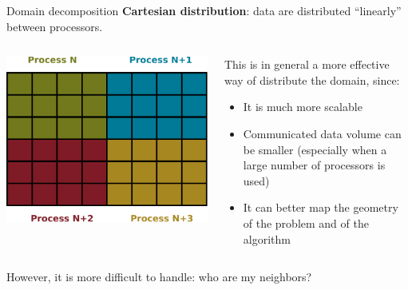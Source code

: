 \documentclass[aspectratio=43]{beamer}
\begin{document}
\begin{frame}[fragile]{Domain decomposition}
\textbf{Cartesian distribution}: data are distributed “linearly” between processors.
\vspace{0.5cm}
\begin{columns}
\begin{column}{0.322\paperwidth}
\includegraphics[scale=0.4]{04.MPI_Topo/decomp2.pdf}
\end{column}
\begin{column}{0.5\paperwidth}
This is in general a more effective way of distribute the domain, since:
\begin{itemize}
\item It is much more scalable
\item Communicated data volume can be smaller (especially when a large number of processors is used)
\item It can better map the geometry of the problem and of the algorithm
\end{itemize}
\end{column}
\end{columns}
\vspace{0.5cm}
However, it is more difficult to handle: who are my neighbors?
\end{frame}
\end{document}
